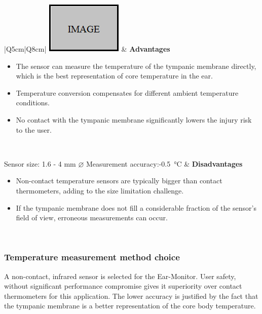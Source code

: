 \begin{table}[H]
\caption{Non-contact thermometers evaluation}
\label{tab:NonContactThermometers_Eval}
\renewcommand{\arraystretch}{1.3}
\centering
\begin{tabular}{|Q{5cm}|Q{8cm}|} 
 \hline
\includegraphics[scale=1]{figs/Image.png}	& 
	\textbf{Advantages}
	\begin{itemize}[leftmargin=1em, noitemsep, topsep=2pt]
	\item The sensor can measure the temperature of the tympanic membrane directly, which is the best representation of core temperature in the ear.
	\item Temperature conversion compensates for different ambient temperature conditions.
	\item No contact with the tympanic membrane significantly lowers the injury risk to the user.
	\end{itemize}\\
\hline

Sensor size: 1.6 - 4 mm ${\diameter}$ \newline	Measurement accuracy:-\SI{0.5}{\celsius}		&	
	\textbf{Disadvantages}
	\begin{itemize}[leftmargin=1em, noitemsep, topsep=2pt]
	\item Non-contact temperature sensors are typically bigger than contact thermometers, adding to the size limitation challenge.
	\item If the tympanic membrane does not fill a considerable fraction of the sensor's field of view, erroneous measurements can occur.
	\end{itemize}\\
\hline

\end{tabular}
\end{table}

\subsubsection{Temperature measurement method choice}
A non-contact, infrared sensor is selected for the Ear-Monitor. User safety, without significant performance compromise gives it superiority over contact thermometers for this application. The lower accuracy is justified by the fact that the tympanic membrane is a better representation of the core body temperature.

